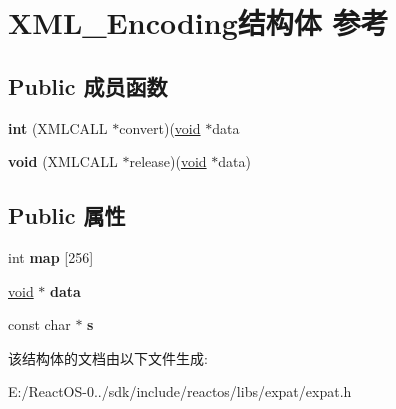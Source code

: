\hypertarget{struct_x_m_l___encoding}{}\section{X\+M\+L\+\_\+\+Encoding结构体 参考}
\label{struct_x_m_l___encoding}
\subsection*{Public 成员函数}
\begin{DoxyCompactItemize}
\item 
\mbox{\label{struct_x_m_l___encoding_a0e78058177f2573fd3e3597cfea390ef}} 
{\bfseries int} (X\+M\+L\+C\+A\+LL $\ast$convert)(\hyperlink{interfacevoid}{void} $\ast$data
\item 
\mbox{\label{struct_x_m_l___encoding_a8af470efc752980eaed0893cd1a2353a}} 
{\bfseries void} (X\+M\+L\+C\+A\+LL $\ast$release)(\hyperlink{interfacevoid}{void} $\ast$data)
\end{DoxyCompactItemize}
\subsection*{Public 属性}
\begin{DoxyCompactItemize}
\item 
\mbox{\label{struct_x_m_l___encoding_a969fc4ff9f38c5e5d9105efb1b64f8af}} 
int {\bfseries map} \mbox{[}256\mbox{]}
\item 
\mbox{\label{struct_x_m_l___encoding_a308f320aa234f14b1effd3526a7ae840}} 
\hyperlink{interfacevoid}{void} $\ast$ {\bfseries data}
\item 
\mbox{\label{struct_x_m_l___encoding_a71954164de94d278141718e5e80771ae}} 
const char $\ast$ {\bfseries s}
\end{DoxyCompactItemize}


该结构体的文档由以下文件生成\+:\begin{DoxyCompactItemize}
\item 
E\+:/\+React\+O\+S-\/0../sdk/include/reactos/libs/expat/expat.\+h\end{DoxyCompactItemize}

